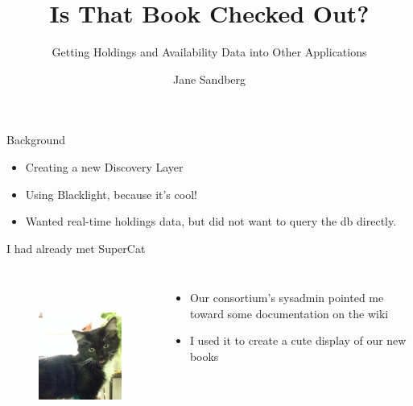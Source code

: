 \documentclass{beamer}
\begin{document}
\title{Is That Book Checked Out?}
\subtitle{Getting Holdings and Availability Data into Other Applications}
\author{Jane Sandberg}

\renewcommand{\figurename}{Credit}

\begin{frame}
 \titlepage
\end{frame}


\begin{frame}{Background}
 \begin{itemize}
  \item Creating a new Discovery Layer
  \item Using Blacklight, because it's cool!
  \item Wanted real-time holdings data, but did not want to query the db directly.
 \end{itemize}

\end{frame}

\begin{frame}{I had already met SuperCat}

\begin{columns}

 \begin{figure}
  \begin{center}
   \includegraphics[height=2in]{supercat.jpg}
  \end{center}

 \end{figure}

\begin{itemize}
 \item Our consortium's sysadmin pointed me toward some documentation on the wiki
 \item I used it to create a cute display of our new books
\end{itemize}

\end{columns}
 
\end{frame}
\end{document}
